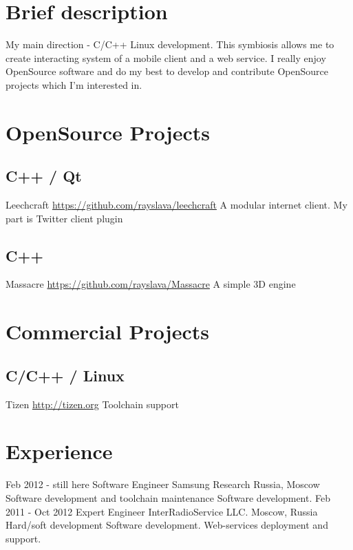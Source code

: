\documentclass[11pt,a4paper]{moderncv}
\begin{document}
\maketitle

\section{Brief description}
\cvitem
  {}
  {My main direction - C/C++ Linux development.\newline{}
  This symbiosis allows me to create interacting system of a mobile client and a web service.\newline{}
  I really enjoy OpenSource software and do my best to develop and contribute OpenSource projects which I'm interested in.}

\section{OpenSource Projects}
\subsection{C++ / Qt}
\cvitem
  {Leechcraft}
  {\url{https://github.com/rayslava/leechcraft}\newline{}
  A modular internet client. My part is Twitter client plugin}
\subsection{C++}
\cvitem
  {Massacre}
  {\url{https://github.com/rayslava/Massacre}\newline{}
  A simple 3D engine}

\section{Commercial Projects}
  \subsection{C/C++ / Linux}
  \cvitem
    {Tizen}
    {\url{http://tizen.org}\newline{}
    Toolchain support}

\section{Experience}
\cventry
  {Feb 2012 - still here}
  {Software Engineer}
  {Samsung Research Russia, Moscow}
  {}{}
  {Software development and toolchain maintenance
  \newline{}Software development.}
\cventry
  {Feb 2011 - Oct 2012}
  {Expert Engineer}
  {InterRadioService LLC. Moscow, Russia}
  {}{}
  {Hard/soft development
  \newline{}Software development.
  \newline{}Web-services deployment and support.}
\end{document}
